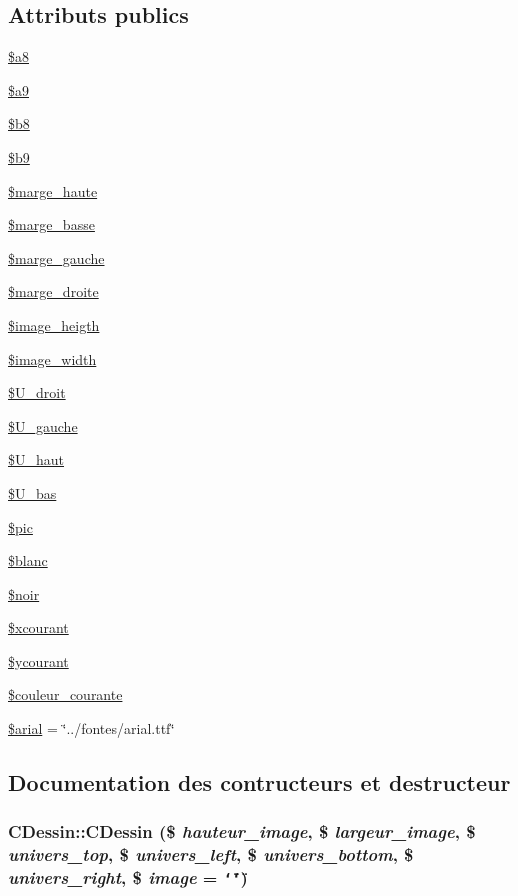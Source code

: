 \subsection*{Attributs publics}
\begin{CompactItemize}
\item 
\hyperlink{classCDessin_o0}{\$a8}
\item 
\hyperlink{classCDessin_o1}{\$a9}
\item 
\hyperlink{classCDessin_o2}{\$b8}
\item 
\hyperlink{classCDessin_o3}{\$b9}
\item 
\hyperlink{classCDessin_o4}{\$marge\_\-haute}
\item 
\hyperlink{classCDessin_o5}{\$marge\_\-basse}
\item 
\hyperlink{classCDessin_o6}{\$marge\_\-gauche}
\item 
\hyperlink{classCDessin_o7}{\$marge\_\-droite}
\item 
\hyperlink{classCDessin_o8}{\$image\_\-heigth}
\item 
\hyperlink{classCDessin_o9}{\$image\_\-width}
\item 
\hyperlink{classCDessin_o10}{\$U\_\-droit}
\item 
\hyperlink{classCDessin_o11}{\$U\_\-gauche}
\item 
\hyperlink{classCDessin_o12}{\$U\_\-haut}
\item 
\hyperlink{classCDessin_o13}{\$U\_\-bas}
\item 
\hyperlink{classCDessin_o14}{\$pic}
\item 
\hyperlink{classCDessin_o15}{\$blanc}
\item 
\hyperlink{classCDessin_o16}{\$noir}
\item 
\hyperlink{classCDessin_o17}{\$xcourant}
\item 
\hyperlink{classCDessin_o18}{\$ycourant}
\item 
\hyperlink{classCDessin_o19}{\$couleur\_\-courante}
\item 
\hyperlink{classCDessin_o20}{\$arial} = \char`\"{}../fontes/arial.ttf\char`\"{}
\end{CompactItemize}


\subsection{Documentation des contructeurs et destructeur}
\hypertarget{classCDessin_a0}{
\subsubsection[CDessin]{\setlength{\rightskip}{0pt plus 5cm}CDessin::CDessin (\$ {\em hauteur\_\-image}, \$ {\em largeur\_\-image}, \$ {\em univers\_\-top}, \$ {\em univers\_\-left}, \$ {\em univers\_\-bottom}, \$ {\em univers\_\-right}, \$ {\em image} = {\tt \char`\"{}\char`\"{}})}}
\label{classCDessin_a0}


